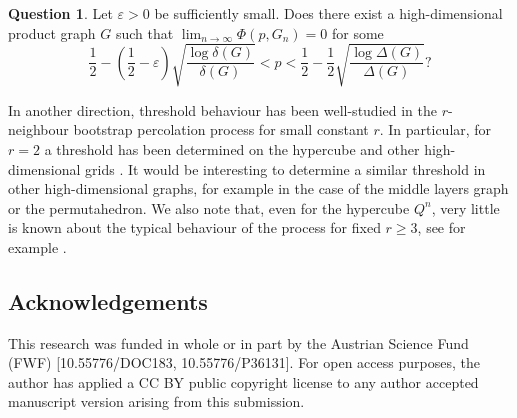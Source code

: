 \documentclass[reqno,a4paper,11pt]{amsart}
\theoremstyle{definition}
\newtheorem{question}[theorem]{Question}
\renewcommand{\geq}{\geqslant}
\begin{document}
\begin{question}
  Let $\varepsilon >0$ be sufficiently small.
  Does there exist a high-dimensional product graph $G$ such that $\lim_{n \to \infty} \Phi(p, G_n) = 0$ for some
  \[
    \frac{1}{2} - \left(\frac{1}{2} - \varepsilon\right) \sqrt{\frac{\log \delta(G)}{\delta(G)}} < p < \frac{1}{2} - \frac{1}{2} \sqrt{\frac{\log \Delta(G)}{\Delta(G)}}?
  \]
\end{question}

In another direction, threshold behaviour has been well-studied in the $r$-neighbour bootstrap percolation process for small constant $r$.
In particular, for $r=2$ a threshold has been determined on the hypercube and other high-dimensional grids \cite{BaBo2006HypercubeR2,BaBoMo2010HighDimGrid}.
It would be interesting to determine a similar threshold in other high-dimensional graphs, for example in the case of the middle layers graph or the permutahedron.
We also note that, even for the hypercube $Q^n$, very little is known about the typical behaviour of the process for fixed $r \geq 3$, see for example \cite[Conjecture 6.3]{BaBoMo2010HighDimGrid}.

\subsection*{Acknowledgements}
This research was funded in whole or in part by the Austrian Science Fund (FWF) [10.55776/DOC183, 10.55776/P36131].
For open access purposes, the author has applied a CC BY public copyright license to any author accepted manuscript version arising from this submission.

\printbibliography
\end{document}
